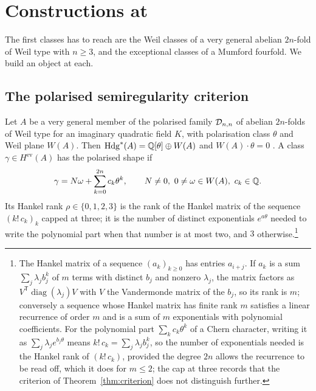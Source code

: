 \section{Constructions at \Fii{}}\label{sec:f2}

The first classes \Fii{} has to reach are the Weil classes of a very general abelian $2n$-fold of Weil type with $n\ge3$, and the exceptional classes of a Mumford fourfold. We build an object at each.

\subsection{The polarised semiregularity criterion}\label{ssec:criterion}

Let $A$ be a very general member of the polarised family $\mathcal{D}_{n,n}$ of abelian $2n$-folds of Weil type for an imaginary quadratic field $K$, with polarisation class $\theta$ and Weil plane $W(A)$. Then $\mathrm{Hdg}^{*}(A)=\mathbb{Q}[\theta]\oplus W(A)$ and $W(A)\cdot\theta=0$ \cite[Thm.~4.14]{BMB26}. A class $\gamma\in H^{\mathrm{ev}}(A)$ has the polarised shape if
\[
\gamma=N\omega+\sum_{k=0}^{2n}c_{k}\theta^{k},\qquad N\ne0,\ 0\ne\omega\in W(A),\ c_{k}\in\mathbb{Q} .
\]
Its Hankel rank $\rho\in\{0,1,2,3\}$ is the rank of the Hankel matrix of the sequence $(k!\,c_{k})_{k}$ capped at three; it is the number of distinct exponentials $e^{a\theta}$ needed to write the polynomial part when that number is at most two, and $3$ otherwise.\footnote{The Hankel matrix of a sequence $(a_{k})_{k\ge0}$ has entries $a_{i+j}$. If $a_{k}$ is a sum $\sum_{j}\lambda_{j}b_{j}^{k}$ of $m$ terms with distinct $b_{j}$ and nonzero $\lambda_{j}$, the matrix factors as $V^{\mathsf{T}}\operatorname{diag}(\lambda_{j})V$ with $V$ the Vandermonde matrix of the $b_{j}$, so its rank is $m$; conversely a sequence whose Hankel matrix has finite rank $m$ satisfies a linear recurrence of order $m$ and is a sum of $m$ exponentials with polynomial coefficients. For the polynomial part $\sum_{k}c_{k}\theta^{k}$ of a Chern character, writing it as $\sum_{j}\lambda_{j}e^{b_{j}\theta}$ means $k!\,c_{k}=\sum_{j}\lambda_{j}b_{j}^{k}$, so the number of exponentials needed is the Hankel rank of $(k!\,c_{k})$, provided the degree $2n$ allows the recurrence to be read off, which it does for $m\le2$; the cap at three records that the criterion of Theorem~\ref{thm:criterion} does not distinguish further.}

